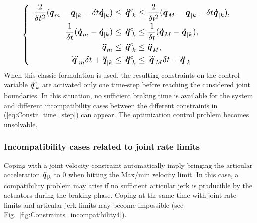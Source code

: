 \documentclass[a4paper, 10pt, conference]{ieeeconf}      %
\newcommand{\vect}[1]{\mbox{\boldmath${#1}$}}%
\begin{document}
\begin{equation} 
\resizebox{0.891\hsize}{!}{$
\left\{\begin{array}{l}
\begin{split}
%
\frac{2}{\delta t^2} (\vect{q}_{m}-\vect{q}_{|k}-\delta t \vect{\dot{q}}_{|k}) \leq & \hspace{1.5mm} \vect{\ddot{q}}_{|k}^{c} \leq \frac{2}{\delta t^2} (\vect{q}_{M}-\vect{q}_{|k}-\delta t \vect{\dot{q}}_{|k}),\\
\frac{1}{\delta t} (\vect{\dot{q}}_{m}-\vect{\dot{q}}_{|k}) \leq  & \hspace{1.5mm} \vect{\ddot{q}}_{|k}^{c} \leq \frac{1}{\delta t} (\vect{\dot{q}}_{M}-\vect{\dot{q}}_{|k}),\\
\vect{\ddot{q}}_{m} \leq & \hspace{1.5mm} \vect{\ddot{q}}_{|k}^{c} \leq \vect{\ddot{q}}_{M},\\
\vect{\dddot{q}}_{m} \delta t+\vect{\ddot{q}}_{|k} \leq  & \hspace{1.5mm} \vect{\ddot{q}}_{|k}^{c} \leq \vect{\dddot{q}}_{M} \delta t+\vect{\ddot{q}}_{|k}
\end{split}
\end{array}\right.$}
\label{eq:Constr_time_step}
\end{equation}
When this classic formulation is used, the resulting constraints on the control variable $\vect{\ddot{q}}_{|k}^{c}$ are activated only one time-step before reaching the considered joint boundaries. In this situation, no sufficient braking time is available for the system and different incompatibility cases between the different constraints in (\ref{eq:Constr_time_step}) can appear. The optimization control problem becomes unsolvable. 
\subsubsection{Incompatibility cases related to joint rate limits}
Coping with a joint velocity constraint automatically imply bringing the articular acceleration $\vect{\ddot{q}}_{|k}$ to $0$ when hitting the Max/min velocity limit. In this case, a compatibility problem may arise if no sufficient articular jerk is producible by the actuators during the braking phase. Coping at the same time with joint rate limits and articular jerk limits may become impossible (see Fig.~\ref{fig:Constraints_incompatibility4}).
\end{document}
